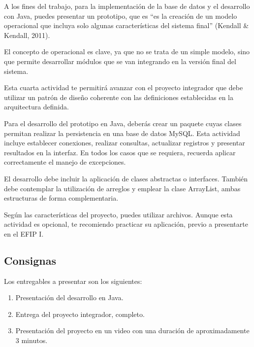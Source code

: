 \documentclass{article}
\begin{document}
A los fines del trabajo, para la implementación de la base de datos y el desarrollo con Java, puedes presentar un prototipo, que es “es la creación de un modelo operacional que incluya solo algunas características del sistema final” (Kendall \& Kendall, 2011).

\vspace{3pt}

El concepto de operacional es clave, ya que no se trata de un simple modelo, sino que permite desarrollar módulos que se van integrando en la versión final del sistema.

\vspace{3pt}

Esta cuarta actividad te permitirá avanzar con el proyecto integrador que debe utilizar un patrón de diseño coherente con las definiciones establecidas en la arquitectura definida.

\vspace{3pt}

Para el desarrollo del prototipo en Java, deberás crear un paquete cuyas clases permitan realizar la persistencia en una base de datos MySQL. Esta actividad incluye establecer conexiones, realizar consultas, actualizar registros y presentar resultados en la interfaz. En todos los casos que se requiera, recuerda aplicar correctamente el manejo de excepciones.

\vspace{3pt}

El desarrollo debe incluir la aplicación de clases abstractas o interfaces. También debe contemplar la utilización de arreglos y emplear la clase ArrayList, ambas estructuras de forma complementaria.

\vspace{3pt}

Según las características del proyecto, puedes utilizar archivos. Aunque esta actividad es opcional, te recomiendo practicar su aplicación, previo a presentarte en el EFIP I.

\vspace{3pt}

\subsection{Consignas}

Los entregables a presentar son los siguientes:
\begin{enumerate}
    \item Presentación del desarrollo en Java.
    \item Entrega del proyecto integrador, completo.
    \item Presentación del proyecto en un video con una duración de aproximadamente 3 minutos.
\end{enumerate}
\end{document}
